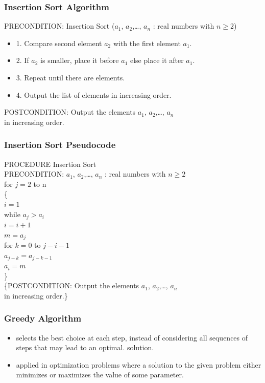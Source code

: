 \documentclass{beamer}
\begin{document}
\begin{frame}
\frametitle{\huge Insertion Sort Algorithm}
PRECONDITION: Insertion Sort ($a_1$, $a_2$,\ldots, $a_n$ : real numbers with $n \ge 2$) 
\begin{itemize} 
\Large
\item <1-> 1. Compare second element $a_2$ with the first element $a_1$. 
\item <2-> 2. If $a_2$ is smaller, place it before $a_1$ else place it after $a_1$.
\item <3-> 3. Repeat until there are elements.
\item <4-> 4. Output the list of elements in increasing order.
\end{itemize}
POSTCONDITION: Output the elements $a_1$, $a_2$,\ldots, $a_n$ \\ in increasing order. 
\end{frame}


\begin{frame}
\frametitle{\huge Insertion Sort Pseudocode}
PROCEDURE Insertion Sort \\ 
PRECONDITION: $a_1$, $a_2$,\ldots, $a_n$ : real numbers with $n \ge 2$ \\
\quad for $j = 2$ to n \\
\quad \{ \\
\qquad $i = 1$ \\ 
\quad while $a_j > a_i$ \\
\qquad \:\: $i = i + 1$ \\
\qquad $m= a_j$ \\
\qquad for $k = 0$ to $j - i - 1$ \\
\qquad \:\: $a_{j-k}= a_{j-k-1}$ \\
\qquad $a_i= m$ \\
\quad \} \\
\{POSTCONDITION: Output the elements $a_1$, $a_2$,\ldots, $a_n$ \\ in increasing order.\}
\end{frame}


\begin{frame}
\frametitle{\huge Greedy Algorithm}
\begin{itemize} 
\Large
\item <1-> selects the best choice at each step, instead of considering all sequences of steps that may lead to an optimal. solution.
\item <2-> applied in optimization problems where a solution to the given problem either minimizes or maximizes the value of some parameter.
\end{itemize}
\end{frame}
\end{document}

